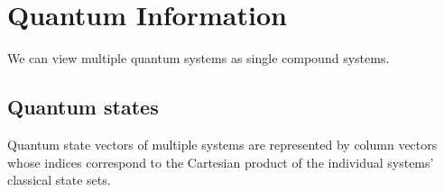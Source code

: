 
\section{Quantum Information}
We can view multiple quantum systems as single compound systems.

\subsection{Quantum states}
Quantum state vectors of multiple systems are represented by column vectors whose indices correspond to the Cartesian product of the individual systems' classical state sets.
